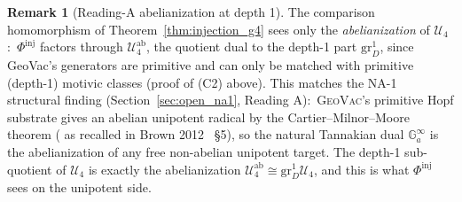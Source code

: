 \documentclass[11pt,a4paper]{article}
\theoremstyle{plain}
\theoremstyle{definition}
\newtheorem{remark}[theorem]{Remark}
\newcommand{\Ga}{\mathbb{G}_{a}}
\begin{document}
\begin{remark}[Reading-A abelianization at depth 1]\label{rem:reading_a_at_depth_1}
The comparison homomorphism of Theorem~\ref{thm:injection_g4} sees only the
\emph{abelianization} of $\mathcal{U}_{4}$:\ $\Phi^{\mathrm{inj}}$ factors
through $\mathcal{U}_{4}^{\mathrm{ab}}$, the quotient dual to the depth-1
part $\mathrm{gr}^{1}_{D}$, since GeoVac's generators are primitive and
can only be matched with primitive (depth-1) motivic classes (proof of (C2)
above). This
matches the NA-1 structural finding (Section~\ref{sec:open_na1},
Reading A):\ \textsc{GeoVac}'s primitive Hopf substrate gives an
abelian unipotent radical by the Cartier--Milnor--Moore theorem
(\cite{cartier_milnor_moore} as recalled in
Brown 2012~\cite{brown2012} \S 5), so the natural Tannakian dual
$\Ga^{\infty}$ is the abelianization of any free non-abelian
unipotent target. The depth-1 sub-quotient of $\mathcal{U}_{4}$ is
exactly the abelianization $\mathcal{U}_{4}^{\mathrm{ab}} \cong
\mathrm{gr}^{1}_{D} \mathcal{U}_{4}$, and this is what
$\Phi^{\mathrm{inj}}$ sees on the unipotent side.
\end{remark}
\end{document}
